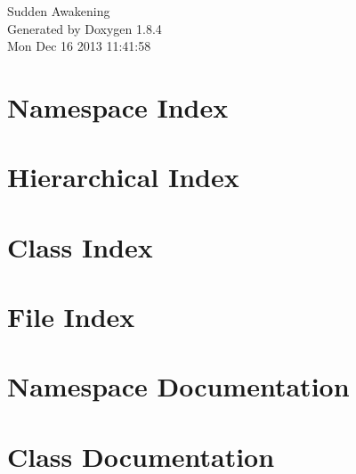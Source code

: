 \documentclass[twoside]{book}
\newcommand{\clearemptydoublepage}{%
  \newpage{\pagestyle{empty}\cleardoublepage}%
}
\begin{document}
\hypersetup{pageanchor=false}
\begin{titlepage}
\vspace*{7cm}
\begin{center}%
{\Large Sudden Awakening }\\
\vspace*{1cm}
{\large Generated by Doxygen 1.8.4}\\
\vspace*{0.5cm}
{\small Mon Dec 16 2013 11:41:58}\\
\end{center}
\end{titlepage}
\clearemptydoublepage
\tableofcontents
\clearemptydoublepage
{}
\hypersetup{pageanchor=true}

\chapter{Namespace Index}

\chapter{Hierarchical Index}

\chapter{Class Index}

\chapter{File Index}

\chapter{Namespace Documentation}



\chapter{Class Documentation}





































\end{document}
